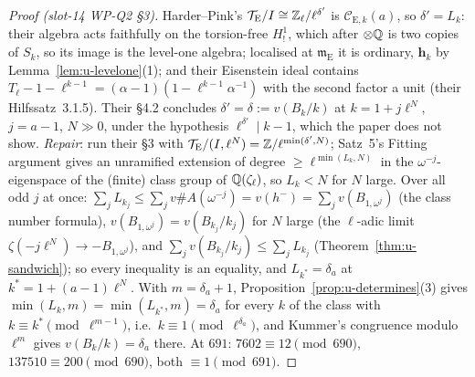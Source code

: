 \documentclass[11pt]{article}
\newcommand{\hcusp}{\mathbf{h}}                   %
\newcommand{\Eis}{\mathrm{E}}
\newcommand{\Cg}{\mathcal{C}}                     %
\newcommand{\Zl}{\Z_\ell}
\begin{document}
\begin{proof}[Proof (slot-14 WP-Q2 \S3)]
Harder--Pink's $\mathcal T_\Eis/I\cong\Zl/\ell^{\delta'}$ is $\Cg_{\Eis,k}(a)$, so $\delta'=L_k$: their algebra acts faithfully on the torsion-free
$H^{1}_{!}$, which after $\otimes\mathbb{Q}$ is two copies of $S_k$, so its image is the level-one algebra; localised at $\mathfrak m_\Eis$ it is ordinary,
$\hcusp_k$ by Lemma~\ref{lem:u-levelone}(1); and their Eisenstein ideal contains $T_\ell-1-\ell^{k-1}=(\alpha-1)(1-\ell^{k-1}\alpha^{-1})$ with the second factor a
unit (their Hilfssatz~3.1.5). Their \S4.2 concludes $\delta'=\delta:=v(B_k/k)$ at $k=1+j\ell^{N}$, $j=a-1$, $N\gg0$, under the hypothesis
$\ell^{\delta'}\mid k-1$, which the paper does not show. \emph{Repair}: run their \S3 with $\mathcal T_\Eis/(I,\ell^{N})=\Z/\ell^{\min(\delta',N)}$; Satz~5's Fitting
argument gives an unramified extension of degree $\ge\ell^{\min(L_k,N)}$ in the $\omega^{-j}$-eigenspace of the (finite) class group of $\mathbb{Q}(\zeta_\ell)$, so
$L_k<N$ for $N$ large. Over all odd $j$ at once: $\sum_jL_{k_j}\le\sum_jv\#A(\omega^{-j})=v(h^{-})=\sum_jv(B_{1,\omega^{j}})$ (the class number formula),
$v(B_{1,\omega^{j}})=v(B_{k_j}/k_j)$ for $N$ large (the $\ell$-adic limit $\zeta(-j\ell^{N})\to-B_{1,\omega^{j}}$), and $\sum_jv(B_{k_j}/k_j)\le\sum_jL_{k_j}$ (Theorem~\ref{thm:u-sandwich}); so every inequality is an
equality, and $L_{k^*}=\delta_a$ at $k^*=1+(a-1)\ell^{N}$. With $m=\delta_a+1$, Proposition~\ref{prop:u-determines}(3) gives $\min(L_k,m)=\min(L_{k^*},m)=\delta_a$ for
every $k$ of the class with $k\equiv k^*\pmod{\ell^{m-1}}$, i.e.\ $k\equiv1\pmod{\ell^{\delta_a}}$, and Kummer's congruence modulo $\ell^{m}$ gives $v(B_k/k)=\delta_a$
there. At $691$: $7602\equiv12\pmod{690}$, $137510\equiv200\pmod{690}$, both $\equiv1\pmod{691}$.
\end{proof}
\end{document}
